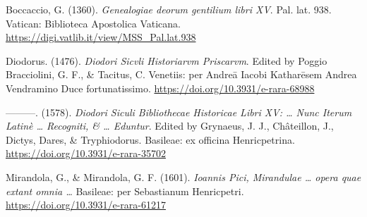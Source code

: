 \documentclass[
]{article}
\begin{document}
Boccaccio, G. (1360). \emph{Genealogiae deorum gentilium libri XV}. Pal.
lat. 938. Vatican: Biblioteca Apostolica Vaticana.
\url{https://digi.vatlib.it/view/MSS_Pal.lat.938}

Diodorus. (1476). \emph{Diodori Sicvli Historiarvm Priscarvm}. Edited by
Poggio Bracciolini, G. F., \& Tacitus, C. Venetiis: per Andreā Iacobi
Katharēsem Andrea Vendramino Duce fortunatissimo.
\url{https://doi.org/10.3931/e-rara-68988}

---------. (1578). \emph{Diodori Siculi Bibliothecae Historicae Libri
XV: \ldots{} Nunc Iterum Latinè \ldots{} Recogniti, \& \ldots{}
Eduntur}. Edited by Grynaeus, J. J., Châteillon, J., Dictys, Dares, \&
Tryphiodorus. Basileae: ex officina Henricpetrina.
\url{https://doi.org/10.3931/e-rara-35702}

Mirandola, G., \& Mirandola, G. F. (1601). \emph{Ioannis Pici,
Mirandulae \ldots{} opera quae extant omnia \ldots{}} Basileae: per
Sebastianum Henricpetri. \url{https://doi.org/10.3931/e-rara-61217}
\end{document}
